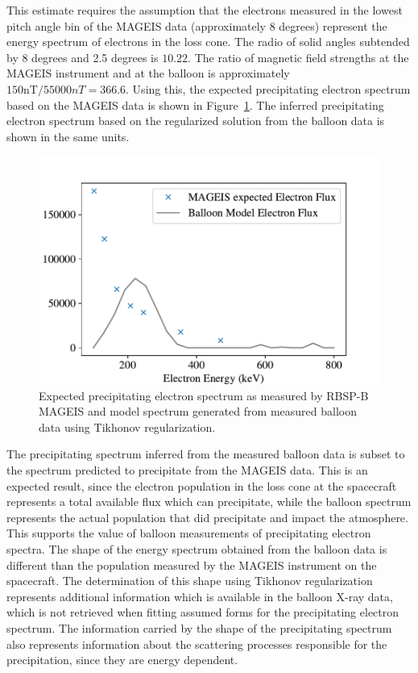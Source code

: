 This estimate requires the assumption that the electrons measured in the lowest pitch angle bin of the MAGEIS data (approximately 8 degrees) represent the energy spectrum of electrons in the loss cone. The radio of solid angles subtended by 8 degrees and 2.5 degrees is $10.22$. The ratio of magnetic field strengths at the MAGEIS instrument and at the balloon is approximately $150 \text{nT}/55000{nT} = 366.6$. Using this, the expected precipitating electron spectrum based on the MAGEIS data is shown in Figure~\ref{mageis_spectrum}. The inferred precipitating electron spectrum based on the regularized solution from the balloon data is shown in the same units. 

\begin{figure}[p]
    \centering
    \includegraphics[width=1.0\textwidth]{figures/chapter_5/mageis_spectrum/mageis_spectrum_2}
    \caption{Expected precipitating electron spectrum as measured by RBSP-B MAGEIS and model spectrum generated from measured balloon data using Tikhonov regularization.}
    \label{mageis_spectrum}
\end{figure}

The precipitating spectrum inferred from the measured balloon data is subset to the spectrum predicted to precipitate from the MAGEIS data. This is an expected result, since the electron population in the loss cone at the spacecraft represents a total available flux which can precipitate, while the balloon spectrum represents the actual population that did precipitate and impact the atmosphere. This supports the value of balloon measurements of precipitating electron spectra. The shape of the energy spectrum obtained from the balloon data is different than the population measured by the MAGEIS instrument on the spacecraft. The determination of this shape using Tikhonov regularization represents additional information which is available in the balloon X-ray data, which is not retrieved when fitting assumed forms for the precipitating electron spectrum. The information carried by the shape of the precipitating spectrum also represents information about the scattering processes responsible for the precipitation, since they are energy dependent. 






